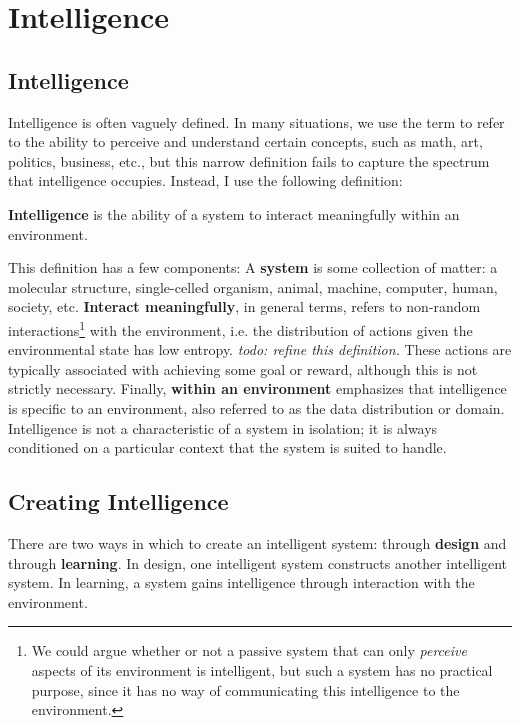 \chapter{Intelligence}

\section{Intelligence}

Intelligence is often vaguely defined. In many situations, we use the term to refer to the ability to perceive and understand certain concepts, such as math, art, politics, business, etc., but this narrow definition fails to capture the spectrum that intelligence occupies. Instead, I use the following definition:

\begin{center}
	\textbf{Intelligence} is the ability of a system to interact meaningfully within an environment. 
\end{center}

This definition has a few components: A \textbf{system} is some collection of matter: a molecular structure, single-celled organism, animal, machine, computer, human, society, etc. \textbf{Interact meaningfully}, in general terms, refers to non-random interactions\footnote{We could argue whether or not a passive system that can only \textit{perceive} aspects of its environment is intelligent, but such a system has no practical purpose, since it has no way of communicating this intelligence to the environment.} with the environment, i.e. the distribution of actions given the environmental state has low entropy. \textit{todo: refine this definition.} These actions are typically associated with achieving some goal or reward, although this is not strictly necessary. Finally, \textbf{within an environment} emphasizes that intelligence is specific to an environment, also referred to as the data distribution or domain. Intelligence is not a characteristic of a system in isolation; it is always conditioned on a particular context that the system is suited to handle.

\section{Creating Intelligence}

There are two ways in which to create an intelligent system: through \textbf{design} and through \textbf{learning}. In design, one intelligent system constructs another intelligent system. In learning, a system gains intelligence through interaction with the environment.
